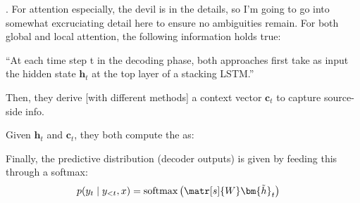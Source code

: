 \documentclass[11pt]{article}
\renewcommand\vec[2][]{\bm{#2}_{#1}}
\newcommand\p{\Needspace{10\baselineskip} \noindent}
\begin{document}
\p {}. For attention especially, the devil is in the details, so I'm going to go into somewhat excruciating detail here to ensure no ambiguities remain. For both global and local attention, the following information holds true:
\begin{compactitem}
	\item ``At each time step t in the decoding phase, both approaches first take as input the hidden state $\vec[t]{h}$ at the top layer of a stacking LSTM.'' 
	\item Then, they derive [with different methods] a context vector $\vec[t]{c}$ to capture source-side info.
	\item Given $\vec[t]{h}$ and $\vec[t]{c}$, they both compute the  as:
	\graybox{
		\vec[t]{\tilde h} &= \tanh\left(  \matr[c]{W} [\vec[t]{c};~ \vec[t]{h}]   \right)
		}
		
	\item Finally, the predictive distribution (decoder outputs) is given by feeding this through a softmax:
	\begin{align}
		p(y_t \mid y_{<t}, x) &= \text{softmax}\left(  \matr[s]{W} \vec[t]{\tilde h}   \right)
	\end{align}
\end{compactitem}
\end{document}
